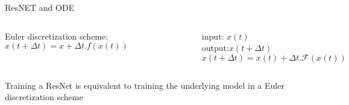 \documentclass[handout]{beamer}
\begin{document}
\begin{frame}{ResNET and ODE}
\begin{columns}
Euler discretization scheme:
$$
 x(t+\Delta t) = x + \Delta t.f(x(t)) 
$$
\pause
{}
    \begin{figure}
    \centering
    \includegraphics[width=.9\textwidth]{fig/L2/res_block.png}

    \end{figure}
    input: $x(t)$~\\ output:$x(t+\Delta t)$
    $$
    x(t+\Delta t) = x(t) + \Delta t.\mathcal{F}(x(t)) 
    $$
    
    \end{columns}
    \pause
    \alert{Training a ResNet is equivalent to training the underlying model in a Euler discretization scheme}
\end{frame}
\end{document}
